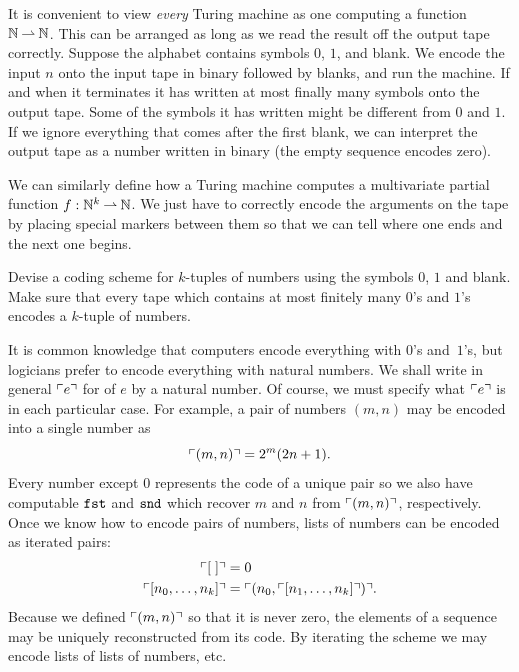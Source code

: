 It is convenient to view \emph{every} Turing machine as one computing a
function $\mathbb{N} \mathbin{\rightharpoonup} \mathbb{N}$. This can be arranged as long as we read the
result off the output tape correctly. Suppose the alphabet contains
symbols $0$, $1$, and blank. We encode the input $n$ onto the input
tape in binary followed by blanks, and run the machine. If and when it
terminates it has written at most finally many symbols onto the output
tape. Some of the symbols it has written might be different from $0$
and $1$. If we ignore everything that comes after the first blank, we
can interpret the output tape as a number written in binary (the empty
sequence encodes zero).

We can similarly define how a Turing machine computes a multivariate
partial function $f : \mathbb{N}^k \mathbin{\rightharpoonup} \mathbb{N}$. We just have to correctly
encode the arguments on the tape by placing special markers between
them so that we can tell where one ends and the next one begins.

\begin{exercise}
  Devise a coding scheme for $k$-tuples of numbers using the symbols $0$, $1$ and blank. Make sure that every tape which contains at most finitely many $0$'s and $1$'s encodes a $k$-tuple of numbers.
\end{exercise}

It is common knowledge that computers encode everything with $0$'s and~$1$'s, but logicians prefer to encode everything with natural numbers.
We shall write in general $\ulcorner e \urcorner$ for  of $e$ by a natural
number. Of course, we must specify what $\ulcorner e \urcorner$ is in each
particular case. For example, a pair of numbers $(m, n)$ may be
encoded into a single number as
%
\begin{equation*}
  \ulcorner (m, n) \urcorner = 2^m (2 n + 1).
\end{equation*}
%
Every number except $0$ represents the code of a unique pair so we
also have computable  $\mathtt{fst}$ and $\mathtt{snd}$ which
recover $m$ and $n$ from $\ulcorner (m, n) \urcorner$, respectively.
Once we know how to encode pairs of numbers, lists of numbers can be encoded as iterated pairs:
%
\begin{align*}
  \ulcorner [\;] \urcorner &= 0 \\
  \ulcorner [n_0, \ldots, n_k] \urcorner &= \ulcorner (n_0, \ulcorner [n_1, \ldots, n_k] \urcorner) \urcorner.
\end{align*}
%
Because we defined $\ulcorner (m,n) \urcorner$ so that it is never zero, the
elements of a sequence may be uniquely reconstructed from its code.
By iterating the scheme we may encode lists of lists of numbers, etc.

